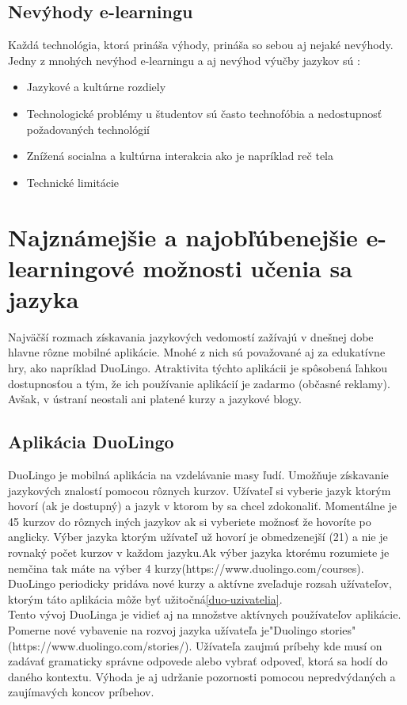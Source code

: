 \documentclass[10pt,oneside,slovak,a4paper]{article}
\begin{document}
\subsection{Nevýhody e-learningu}%
Každá technológia, ktorá prináša výhody, prináša so sebou aj nejaké nevýhody. Jedny z mnohých nevýhod e-learningu a aj nevýhod výučby jazykov sú :

\begin{itemize}
\item Jazykové a kultúrne rozdiely \cite{efektivnost}
\item Technologické problémy u študentov sú často technofóbia a nedostupnosť požadovaných technológií \cite{nevyhody}
\item Znížená socialna a kultúrna interakcia ako je napríklad reč tela \cite{nevyhody}
\item Technické limitácie\cite{efektivnost}
\end{itemize}

\section{Najznámejšie a najobľúbenejšie e-learningové možnosti učenia sa jazyka}%
Najväčší rozmach získavania jazykových vedomostí zažívajú v dnešnej dobe hlavne rôzne mobilné aplikácie. Mnohé z nich sú považované aj za edukatívne hry, ako napríklad DuoLingo. Atraktivita týchto aplikácii je spôsobená ľahkou dostupnosťou a tým, že ich používanie aplikácií je zadarmo (občasné reklamy). Avšak, v ústraní neostali ani platené kurzy a jazykové blogy.

\subsection{Aplikácia DuoLingo}%
DuoLingo je mobilná aplikácia na vzdelávanie masy ľudí. Umožňuje získavanie jazykových znalostí pomocou rôznych kurzov. Užívateľ si vyberie jazyk ktorým hovorí (ak je dostupný) a jazyk v ktorom by sa chcel zdokonaliť. Momentálne je 45 kurzov do rôznych iných jazykov ak si vyberiete možnosť že hovoríte po anglicky. Výber jazyka ktorým užívateľ už hovorí je obmedzenejší (21) a nie je rovnaký počet kurzov v každom jazyku.Ak výber jazyka ktorému rozumiete je nemčina tak máte na výber 4 kurzy(https://www.duolingo.com/courses).
DuoLingo periodicky pridáva nové kurzy a aktívne zveľaduje rozsah užívateľov, ktorým táto aplikácia môže byť užitočná\ref{duo-uzivatelia}.\\ Tento vývoj DuoLinga je vidieť aj na množstve aktívnych používateľov aplikácie. Pomerne nové vybavenie na rozvoj jazyka užívateľa je"Duolingo stories" (https://www.duolingo.com/stories/). Užívateľa zaujmú príbehy kde musí on zadávať gramaticky správne odpovede alebo vybrať odpoveď, ktorá sa hodí do daného kontextu. Výhoda je aj udržanie pozornosti pomocou nepredvýdaných a zaujímavých koncov príbehov.
\end{document}
